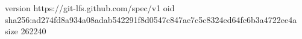 version https://git-lfs.github.com/spec/v1
oid sha256:ad274fd8a934a08adab542291f8d0547c847ae7c5c8324ed64fc6b3a4722ee4a
size 262240
